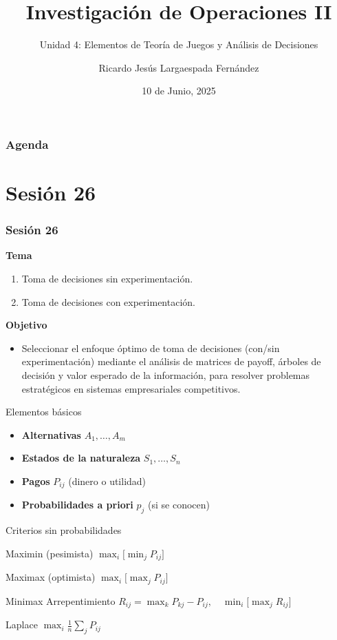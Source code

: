 \documentclass{beamer}
\title{Investigación de Operaciones II}
\subtitle{Unidad 4: Elementos de Teoría de Juegos y Análisis de Decisiones}
\author[Ricardo Largaespada]{Ricardo Jesús Largaespada Fernández}
\institute[UNI]{Ingeniería de Sistemas, DACTIC, UNI}
\date{10 de Junio, 2025}
\begin{document}
\frame{\titlepage}

\begin{frame}
\frametitle{Agenda}
\tableofcontents
\end{frame}

\section{Sesión 26}
\begin{frame}
\frametitle{Sesión 26}

\textbf{Tema}
\begin{enumerate}
\item Toma de decisiones sin experimentación.
\item Toma de decisiones con experimentación.
\end{enumerate}
\textbf{Objetivo}
\begin{itemize}
    \item Seleccionar el enfoque óptimo de toma de decisiones (con/sin experimentación) mediante el análisis de matrices de payoff, árboles de decisión y valor esperado de la información, para resolver problemas estratégicos en sistemas empresariales competitivos.
\end{itemize}
\end{frame}

\begin{frame}{Elementos básicos}
  \begin{itemize}
    \item \textbf{Alternativas} $A_1,\dots,A_m$
    \item \textbf{Estados de la naturaleza} $S_1,\dots,S_n$
    \item \textbf{Pagos} $P_{ij}$  (dinero o utilidad)
    \item \textbf{Probabilidades a priori} $p_j$  (si se conocen)
  \end{itemize}
\end{frame}

\begin{frame}{Criterios sin probabilidades}
  \small
  \begin{block}{Maximin (pesimista)}
    $\displaystyle \max_{i}\bigl[\min_j P_{ij}\bigr]$
  \end{block}
  \begin{block}{Maximax (optimista)}
    $\displaystyle \max_{i}\bigl[\max_j P_{ij}\bigr]$
  \end{block}
  \begin{block}{Minimax Arrepentimiento}
    $R_{ij}=\max_k P_{kj}-P_{ij},\quad
     \displaystyle \min_{i}\bigl[\max_j R_{ij}\bigr]$
  \end{block}
  \begin{block}{Laplace}
    $\displaystyle \max_{i}\frac1n\sum_{j}P_{ij}$
  \end{block}
\end{frame}
\end{document}

